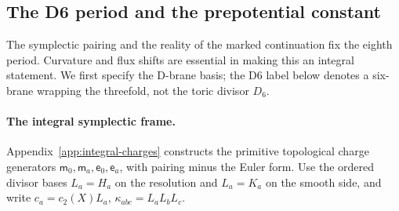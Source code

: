\subsection{The D6 period and the prepotential constant}
\label{subsec:x9-d6-period}

The symplectic pairing and the reality of the marked continuation fix the
eighth period. Curvature and flux shifts are essential in making this
an integral statement. We first specify the D-brane basis; the D6 label
below denotes a six-brane wrapping the threefold, not the toric divisor
$D_6$.

\paragraph{The integral symplectic frame.}
Appendix~\ref{app:integral-charges} constructs the primitive
topological charge generators $\mathsf m_0,\mathsf m_a,\mathsf e_0,
\mathsf e_a$, with pairing minus the Euler form. Use the ordered
divisor bases $L_a=H_a$ on the resolution and $L_a=K_a$ on the
smooth side, and write $c_a=c_2(X)L_a$, $\kappa_{abc}=L_aL_bL_c$.

